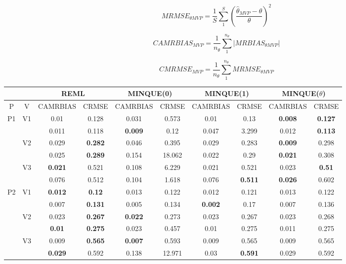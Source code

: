 \documentclass[12pt,a4paper]{article}
\begin{document}
\[
MRMSE_{\theta MVP}=\frac{1}{S}\sum_1^S\left(\frac{\hat{\theta}_{MVP}-\theta}{\theta}\right)^2
\]

\[
CAMRBIAS_{MVP}=\frac{1}{n_{\theta}}\sum_1^{n_{\theta}}|MRBIAS_{\theta MVP}|
\]

\[
CMRMSE_{MVP}=\frac{1}{n_{\theta}}\sum_1^{n_{\theta}}MRMSE_{\theta MVP}
\]


\begin{sidewaystable}[ht]
\centering
{\footnotesize
\begin{tabular}{cc|cc|cc|cc|cc|}
   & & \multicolumn{2}{c|}{REML}&\multicolumn{2}{c|}{MINQUE(0)}&\multicolumn{2}{c|}{MINQUE(1)}&\multicolumn{2}{c|}{MINQUE($\theta$)}\\ \hline
P & V & CAMRBIAS & CRMSE & CAMRBIAS & CRMSE & CAMRBIAS & CRMSE & CAMRBIAS & CRMSE \\ 
  \hline
\multirow{6}{*}{P1} & \multirow{2}{*}{V1} & 0.01 & 0.128 & 0.031 & 0.573 & 0.01 & 0.13 & \textbf{0.008} & \textbf{0.127} \\ 
   &  & 0.011 & 0.118 & \textbf{0.009} & 0.12 & 0.047 & 3.299 & 0.012 & \textbf{0.113} \\ 
   & \multirow{2}{*}{V2} & 0.029 & \textbf{0.282} & 0.046 & 0.395 & 0.029 & 0.283 & \textbf{0.009} & 0.298 \\ 
   &  & 0.025 & \textbf{0.289} & 0.154 & 18.062 & 0.022 & 0.29 & \textbf{0.021} & 0.308 \\ 
   & \multirow{2}{*}{V3} & \textbf{0.021} & 0.521 & 0.108 & 6.229 & 0.021 & 0.521 & 0.023 & \textbf{0.51} \\ 
   &  & 0.076 & 0.512 & 0.104 & 1.618 & 0.076 & \textbf{0.511} & \textbf{0.026} & 0.602 \\ 
   \hline \hline\multirow{6}{*}{P2} & \multirow{2}{*}{V1} & \textbf{0.012} & \textbf{0.12} & 0.013 & 0.122 & 0.012 & 0.121 & 0.013 & 0.122 \\ 
   &  & 0.007 & \textbf{0.131} & 0.005 & 0.134 & \textbf{0.002} & 0.17 & 0.007 & 0.136 \\ 
   & \multirow{2}{*}{V2} & 0.023 & \textbf{0.267} & \textbf{0.022} & 0.273 & 0.023 & 0.267 & 0.023 & 0.268 \\ 
   &  & \textbf{0.01} & \textbf{0.275} & 0.023 & 0.457 & 0.01 & 0.275 & 0.011 & 0.275 \\ 
   & \multirow{2}{*}{V3} & 0.009 & \textbf{0.565} & \textbf{0.007} & 0.593 & 0.009 & 0.565 & 0.009 & 0.565 \\ 
   &  & \textbf{0.029} & 0.592 & 0.138 & 12.971 & 0.03 & \textbf{0.591} & 0.029 & 0.592 \\ 

\end{tabular}}
\end{sidewaystable}
\end{document}
